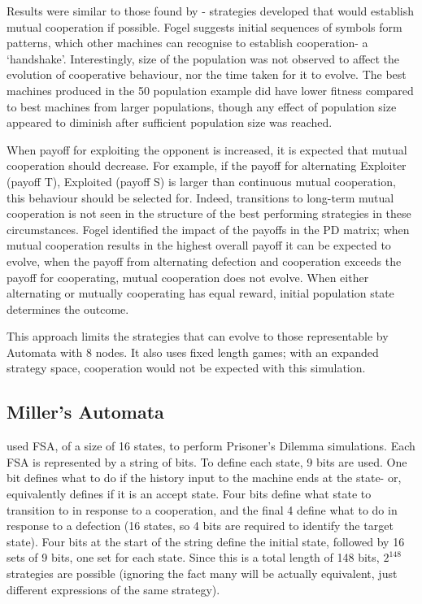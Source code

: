 \documentclass[a4paper,11pt,bcshonoursthesis,singlespace,twoside,thesisdraft,pdflatex]{cssethesis}
\begin{document}
Results were similar to those found by \citep{Axelrod1997}- strategies developed that would establish mutual cooperation if possible. Fogel suggests initial sequences of symbols form patterns, which other machines can recognise to establish cooperation- a `handshake'. 
Interestingly, size of the population was not observed to affect the evolution of cooperative behaviour, nor the time taken for it to evolve. The best machines produced in the 50 population example did have lower fitness compared to best machines from larger populations, though any effect of population size appeared to diminish after sufficient population size was reached. 

When payoff for exploiting the opponent is increased, it is expected that mutual cooperation should decrease. For example, if the payoff for alternating Exploiter (payoff T), Exploited (payoff S) is larger than continuous mutual cooperation, this behaviour should be selected for. Indeed, transitions to long-term mutual cooperation is not seen in the structure of the best performing strategies in these circumstances. Fogel identified the impact of the payoffs in the PD matrix; when mutual cooperation results in the highest overall payoff it can be expected to evolve, when the payoff from alternating defection and cooperation exceeds the payoff for cooperating, mutual cooperation does not evolve. When either alternating or mutually cooperating has equal reward, initial population state determines the outcome. 

This approach limits the strategies that can evolve to those representable by Automata with 8 nodes. 
It also uses fixed length games; with an expanded strategy space, cooperation would not be expected with this simulation.

\subsection{Miller's Automata}
\citet{miller1996coevolution} used FSA, of a size of 16 states, to perform Prisoner's Dilemma simulations.  
Each FSA is represented by a string of bits. 
To define each state, 9 bits are used. One bit defines what to do if the history input to the machine ends at the state- or, equivalently defines if it is an accept state. Four bits define what state to transition to in response to a cooperation, and the final 4 define what to do in response to a defection (16 states, so 4 bits are required to identify the target state). 
Four bits at the start of the string define the initial state, followed by 16 sets of 9 bits, one set for each state. 
Since this is a total length of 148 bits, $2^{148}$ strategies are possible (ignoring the fact many will be actually equivalent, just different expressions of the same strategy). 
\end{document}
